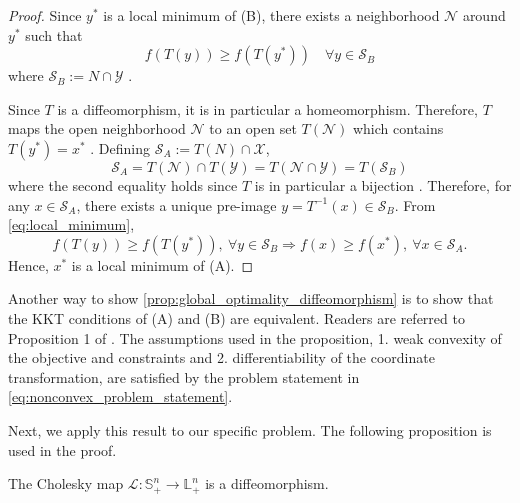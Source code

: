 \begin{proof}
Since $y^*$ is a local minimum of (B), there exists a neighborhood $\mathcal{N}$ around $y^*$ such that
\begin{equation}
\label{eq:local_minimum}
f(T(y)) \geq f(T(y^*)) \quad \forall y \in \mathcal{S}_B
\end{equation}
where $\mathcal{S}_B := N \cap \mathcal{Y}$ \cite[Chapter 12]{nocedalNumericalOptimization2006}.

Since $T$ is a diffeomorphism, it is in particular a homeomorphism. Therefore, $T$ maps the open neighborhood $\mathcal{N}$ to an open set $T(\mathcal{N})$ which contains $T(y^*) = x^*$ \cite[Chapter 12]{munkresTopology2014}.
Defining $\mathcal{S}_A := T(N) \cap \mathcal{X}$,
\begin{equation}
\mathcal{S}_A = T(\mathcal{N}) \cap T(\mathcal{Y}) 
= T(\mathcal{N} \cap \mathcal{Y}) 
= T(\mathcal{S}_B)
\end{equation}
where the second equality holds since $T$ is in particular a bijection \cite[Theorem 12.4]{hammackBookProof2018}.
Therefore, for any $x \in \mathcal{S}_A$, there exists a unique pre-image $y = T^{-1}(x) \in \mathcal{S}_B$. From \cref{eq:local_minimum},
\begin{equation}
f(T(y)) \geq f(T(y^*)),\ \forall y \in \mathcal{S}_B \nonumber
\Rightarrow f(x) \geq f(x^*),\ \forall x \in \mathcal{S}_A. \label{eq:local_optimality_x}
\end{equation}
Hence, \(x^*\) is a local minimum of (A).
\end{proof}

\begin{remark}
	Another way to show \cref{prop:global_optimality_diffeomorphism} is to show that the KKT conditions of (A) and (B) are equivalent. Readers are referred to Proposition 1 of \cite{fatkhullinGlobalSolutionsNonConvex2025}. The assumptions used in the proposition, 1. weak convexity of the objective and constraints and 2. differentiability of the coordinate transformation, are satisfied by the problem statement in \cref{eq:nonconvex_problem_statement}.
\end{remark}

Next, we apply this result to our specific problem. The following proposition is used in the proof.
\begin{proposition}
	\label{prop:cholesky_diffeomorphism}
	The Cholesky map \(\mathcal{L} : \mathbb{S}^n_+ \rightarrow \mathbb{L}_+^n\) is a diffeomorphism.
\end{proposition}

